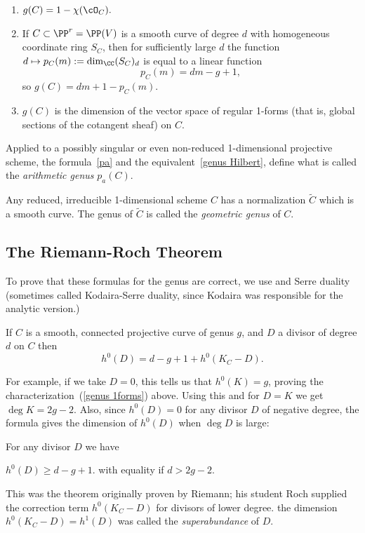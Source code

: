 \begin{enumerate}

\item 
$
g(C) = 1 - \chi(\cO_C). \label{pa}
$

\item\label{genus Hilbert} If $C \subset \PP^r = \PP(V)$ is a smooth curve of degree $d$  with homogeneous coordinate ring
$S_C$, then for sufficiently large $d$ the function $d \mapsto p_C(m) := \dim_\CC (S_C)_d$ is equal to a linear function
$$
p_C(m) =  dm - g + 1,
$$
so $g(C) = dm+1-p_C(m)$. 

\item\label{genus 1forms} $g(C)$ is the dimension of the vector space of regular 1-forms (that is, global sections of the
cotangent sheaf) on $C$.
\end{enumerate}


Applied to a possibly singular or even non-reduced 1-dimensional projective scheme, the formula~\ref{pa} and the equivalent~\ref{genus Hilbert}, define
what is called the \emph{arithmetic genus} $p_a(C)$. 

Any reduced, irreducible 1-dimensional scheme $C$ has a normalization $\widetilde C$ which is a smooth curve. The genus of $\widetilde C$ is called the \emph{geometric genus} of $C$.

\subsection{The Riemann-Roch Theorem}

To prove that these formulas for the genus are correct, we use \trr and Serre duality (sometimes called Kodaira-Serre duality, since Kodaira was responsible for the analytic version.)

\begin{theorem}\label{RR}
 If $C$ is a smooth, connected projective curve of genus $g$, and $D$ a divisor of degree $d$ on $C$ then
$$
h^0(D) = d - g + 1 + h^0(K_C - D).
$$
\end{theorem}

For example, if we take $D=0$, this tells us that $h^0(K) = g$, proving the characterization~(\ref{genus 1forms}) above. Using this and \trr for $D=K$
we get $\deg K = 2g-2$. Also, since $h^0(D) = 0$ for any divisor $D$ of negative degree, the formula gives the dimension of $h^{0}(D)$ when $\deg D$ is large:

\begin{corollary}\label{nonspecial RR}
For any divisor $D$ we have
 
$
h^0(D) \geq d - g + 1.
$
with equality if $d > 2g-2$.
\end{corollary}
This was the theorem originally proven by Riemann; his student Roch supplied the correction term $h^0(K_C - D)$ for divisors of lower degree.
the dimension $h^0(K_C-D) = h^1(D)$ was called the \emph{superabundance} of $D$.

